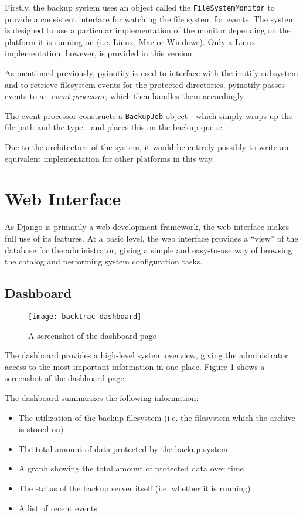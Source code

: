 Firstly, the backup system uses an object called the \verb!FileSystemMonitor!
to provide a consistent interface for watching the file system for events. The
system is designed to use a particular implementation of the monitor depending
on the platform it is running on (i.e. Linux, Mac or Windows). Only a Linux
implementation, however, is provided in this version.

As mentioned previously, pyinotify is used to interface with the inotify
subsystem and to retrieve filesystem events for the protected directories.
pyinotify passes events to an \emph{event processor}, which then handles them
accordingly.

The event processor constructs a \verb!BackupJob! object---which simply wraps
up the file path and the type---and places this on the backup queue.

Due to the architecture of the system, it would be entirely possibly to write
an equivalent implementation for other platforms in this way.

\section{Web Interface}
\label{sec:Implementation-web-interface}

As Django is primarily a web development framework, the web interface makes
full use of its features. At a basic level, the web interface provides
a ``view'' of the database for the administrator, giving a simple and
easy-to-use way of browsing the catalog and performing system configuration
tasks.

\subsection{Dashboard}

\begin{figure}
    \begin{center}
        \texttt{[image: backtrac-dashboard]}
    \end{center}
    \caption{A screenshot of the dashboard page}
    \label{fig:backtrac-dashboard}
\end{figure}

The dashboard provides a high-level system overview, giving the administrator
access to the most important information in one place. Figure
\ref{fig:backtrac-dashboard} shows a screenshot of the dashboard page.

The dashboard summarizes the following information:

\begin{itemize}
    \item The utilization of the backup filesystem (i.e. the filesystem which
        the archive is stored on)
    \item The total amount of data protected by the backup system
    \item A graph showing the total amount of protected data over time
    \item The status of the backup server itself (i.e. whether it is running)
    \item A list of recent events
\end{itemize}
